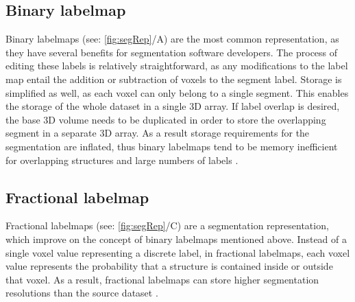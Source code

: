 \subsection{Binary labelmap}\label{s:b-binary-labelmap}
Binary labelmaps (see: \cref{fig:segRep}/A) are the most common representation, as they have several benefits for segmentation software developers.
The process of editing these labels is relatively straightforward, as any modifications to the label map entail the addition or subtraction of voxels to the segment label.
Storage is simplified as well, as each voxel can only belong to a single segment.
This enables the storage of the whole dataset in a single 3D array.
If label overlap is desired, the base 3D volume needs to be duplicated
in order to store the overlapping segment in a separate 3D array.
As a result storage requirements for the segmentation are inflated,
thus binary labelmaps tend to be memory inefficient for overlapping structures and large numbers of labels \cite{slicercommunity3DSlicerImage2022}.


\subsection{Fractional labelmap}\label{s:b-fractional-labelmap}
Fractional labelmaps (see: \cref{fig:segRep}/C) are a segmentation representation, which improve on the concept of binary labelmaps mentioned above.
Instead of a single voxel value representing a discrete label, in fractional labelmaps,
each voxel value represents the probability that a structure is contained inside or outside that voxel.
As a result, fractional labelmaps can store higher segmentation resolutions than the source dataset
\cite{warfieldFractionalSegmentationWhite1999,noePartialVolumeSegmentation2001,pinterPolymorphSegmentationRepresentation2019,sunderlandFractionalLabelmapsComputing2017,weber3DSlicerPlatform2022}.


